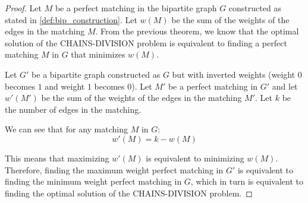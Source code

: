 \begin{proof}
    Let $M$ be a perfect matching in the bipartite graph $G$ constructed as stated in \cref{def:bip_construction}. Let $w(M)$ be the sum of the weights of the edges in the matching $M$. From the previous theorem, we know that the optimal solution of the \textsc{CHAINS-DIVISION} problem is equivalent to finding a perfect matching $M$ in $G$ that minimizes $w(M)$.

    Let $G'$ be a bipartite graph constructed as $G$ but with inverted weights (weight $0$ becomes $1$ and weight $1$ becomes $0$). Let $M'$ be a perfect matching in $G'$ and let $w'(M')$ be the sum of the weights of the edges in the matching $M'$. Let $k$ be the number of edges in the matching.

    We can see that for any matching $M$ in $G$:
    \[ w'(M) = k - w(M) \]

    This means that maximizing $w'(M)$ is equivalent to minimizing $w(M)$. Therefore, finding the maximum weight perfect matching in $G'$ is equivalent to finding the minimum weight perfect matching in $G$, which in turn is equivalent to finding the optimal solution of the \textsc{CHAINS-DIVISION} problem.
\end{proof}
